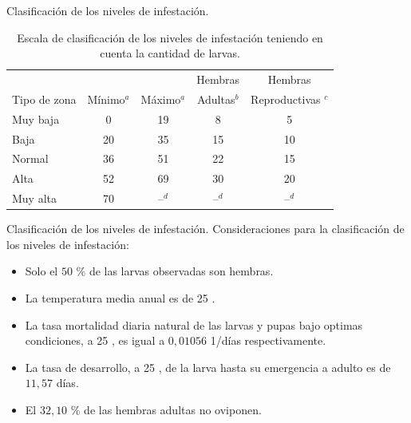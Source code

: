 \begin{frame}[c]{Clasificación de los niveles de infestación.}
  \begin{table}
    \begin{minipage}{\textwidth}
    \begin{center}
    \caption{\label{tab:cap4-puntaje-zona} Escala de clasificación de los niveles de infestación teniendo en cuenta la cantidad de larvas.}
      \begin{tabular}{l c c c c}
          \hline
                       &          &           & Hembras     & Hembras \\
          Tipo de zona &Mínimo$^a$& Máximo$^a$& Adultas$^b$ & Reproductivas $^c$\\
          \hline
          \hline
          Muy baja  & 0  & 19 & 8  & 5 \\
          Baja    & 20 & 35 & 15 & 10\\
          Normal & 36 & 51 & 22 & 15\\
          Alta   & 52 & 69 & 30 & 20\\
          Muy alta  & 70 & --$^d$  & --$^d$  & --$^d$ \\
      \end{tabular}
      \end{center}
    \end{minipage}
  \end{table}
\end{frame}

\begin{frame}[t]{Clasificación de los niveles de infestación.}
  Consideraciones para la clasificación de los niveles de infestación:
  \begin{itemize}
      \item Solo el $50$ \% de las larvas observadas son hembras.
      \item La temperatura media anual es de 25 \textcelsius.
      \item La tasa mortalidad diaria natural de las larvas y pupas bajo optimas condiciones, a 25 \textcelsius, es igual a $0,01056$ 1/días respectivamente.
      \item La tasa de desarrollo, a 25 \textcelsius, de la larva hasta su emergencia a adulto es de $11,57$ días.
      \item El $32,10$ \% de las hembras adultas no oviponen.
  \end{itemize}
\end{frame}

